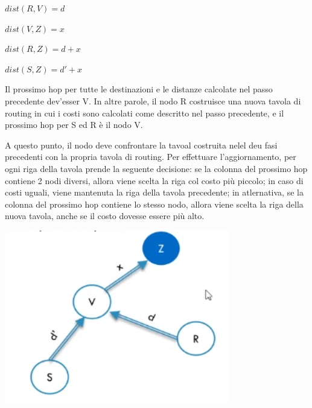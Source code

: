         \begin{center}
            $dist(R, V) = d$
            
            \vspace{2mm}
            
            $dist(V, Z) = x$
            
            \vspace{2mm}
            
            $dist(R, Z) = d+x$
            
            \vspace{2mm}
            
            $dist(S, Z) = d' + x$
        \end{center}
        
        Il prossimo hop per tutte le destinazioni e le distanze calcolate nel passo precedente dev'esser V. In altre parole, il nodo R costruisce una nuova tavola di routing in cui i costi sono calcolati come descritto nel passo precedente, e il prossimo hop per S ed R è il nodo V.
        
        A questo punto, il nodo deve confrontare la tavoal costruita nelel deu fasi precedenti con la propria tavola di routing. Per effettuare l'aggiornamento, per ogni riga della tavola prende la seguente decisione: se la colonna del prossimo hop contiene 2 nodi diversi, allora viene scelta la riga col costo più piccolo; in caso di costi uguali, viene mantenuta la riga della tavola precedente; in atlernativa, se la colonna del prossimo hop contiene lo stesso nodo, allora viene scelta la riga della nuova tavola, anche se il costo dovesse essere più alto.
        
        \begin{center}
            \includegraphics[scale=0.5]{images/Vector3.png}
        \end{center}
        
